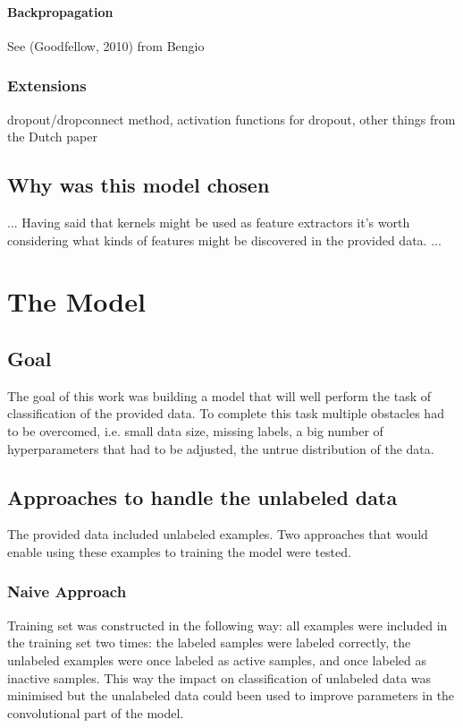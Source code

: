 \documentclass[a4paper,10pt]{report}
\begin{document}
	\subsubsection{Backpropagation} %
	  See (Goodfellow, 2010) from Bengio\\
	
      \subsection{Extensions} %
	dropout/dropconnect method, activation functions for dropout, other things from the Dutch paper\\
	
	
    \section{Why was this model chosen}
	... Having said that kernels might be used as feature extractors it's worth considering what kinds of features might be discovered in the provided data. ...\\
	
  \chapter{The Model} %
      
      \section{Goal}
      The goal of this work was building a model that will well perform the task of classification of the provided data. To complete this task multiple obstacles had to be overcomed, i.e. small data size, missing labels, a big number of hyperparameters that had to be adjusted, the untrue distribution of the data.\\
      
      \section{Approaches to handle the unlabeled data}      
      The provided data included unlabeled examples. Two approaches that would enable using these examples to training the model were tested.\\
      
	\subsection{Naive Approach}
	Training set was constructed in the following way: all examples were included in the training set two times: the labeled samples were labeled correctly, the unlabeled examples were once labeled as active samples, and once labeled as inactive samples. This way the impact on classification of unlabeled data was minimised but the unalabeled data could been used to improve parameters in the convolutional part of the model.\\
	    
\end{document}
